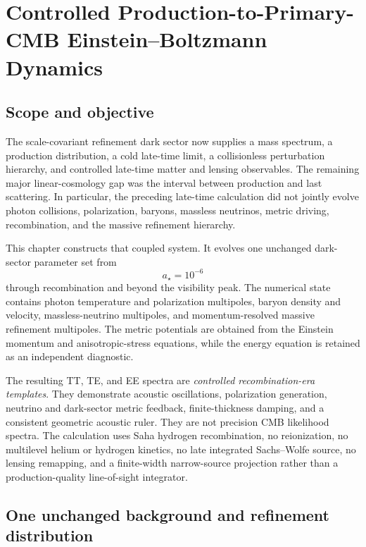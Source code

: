 \chapter{Controlled Production-to-Primary-CMB Einstein--Boltzmann Dynamics}
\label{ch:production-primary-cmb}

\section{Scope and objective}

The scale-covariant refinement dark sector now supplies a mass spectrum, a production distribution, a cold late-time limit, a collisionless perturbation hierarchy, and controlled late-time matter and lensing observables.  The remaining major linear-cosmology gap was the interval between production and last scattering.  In particular, the preceding late-time calculation did not jointly evolve photon collisions, polarization, baryons, massless neutrinos, metric driving, recombination, and the massive refinement hierarchy.

This chapter constructs that coupled system.  It evolves one unchanged dark-sector parameter set from
\begin{equation}
 a_{\star}=10^{-6}
 \label{eq:pcmb-production-scale}
\end{equation}
through recombination and beyond the visibility peak.  The numerical state contains photon temperature and polarization multipoles, baryon density and velocity, massless-neutrino multipoles, and momentum-resolved massive refinement multipoles.  The metric potentials are obtained from the Einstein momentum and anisotropic-stress equations, while the energy equation is retained as an independent diagnostic.

The resulting TT, TE, and EE spectra are \emph{controlled recombination-era templates}.  They demonstrate acoustic oscillations, polarization generation, neutrino and dark-sector metric feedback, finite-thickness damping, and a consistent geometric acoustic ruler.  They are not precision CMB likelihood spectra.  The calculation uses Saha hydrogen recombination, no reionization, no multilevel helium or hydrogen kinetics, no late integrated Sachs--Wolfe source, no lensing remapping, and a finite-width narrow-source projection rather than a production-quality line-of-sight integrator.

\section{One unchanged background and refinement distribution}

